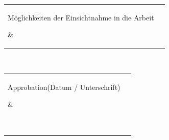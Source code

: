 \vspace{5mm} \noindent
\begin{tabular}{|l|l|}
	\hline
	\parbox[c][20mm]{47mm}{Möglichkeiten der Einsichtnahme in die Arbeit}& \parbox[c][20mm]{105mm}{\accessibilityG} \\ \hline
\end{tabular}\\

\vspace{5mm} \noindent
\begin{tabular}{|l|l|}
	\hline
	\parbox[c][40mm]{47mm}{Approbation\newline (Datum / Unterschrift)}& \parbox[c][40mm]{105mm}{~} \\ \hline
\end{tabular}\\

\clearpage